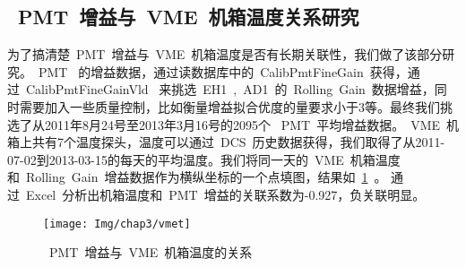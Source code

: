\subsection{~PMT~增益与~VME~机箱温度关系研究}
为了搞清楚~PMT~增益与~VME~机箱温度是否有长期关联性，我们做了该部分研究。~PMT~ 的增益数据，通过读数据库中的~CalibPmtFineGain~获得，通过~CalibPmtFineGainVld~ 来挑选~EH1~,~AD1~的~Rolling~Gain~数据增益，同时需要加入一些质量控制，比如衡量增益拟合优度的量要求小于3等。最终我们挑选了从2011年8月24号至2013年3月16号的2095个%
~PMT~平均增益数据。~VME~机箱上共有7个温度探头，温度可以通过~DCS~历史数据获得，我们取得了从2011-07-02到2013-03-15的每天的平均温度。我们将同一天的~VME~机箱温度和~Rolling~Gain~增益数据作为横纵坐标的一个点填图，结果如~\ref{fig:vmeT}~。 通过~Excel~分析出机箱温度和~PMT~增益的关联系数为-0.927，负关联明显。
\begin{figure}[!htb]
  \centering
   \texttt{[image: Img/chap3/vmet]}
    \caption{~PMT~增益与~VME~机箱温度的关系}
  \label{fig:vmeT}
\end{figure}
